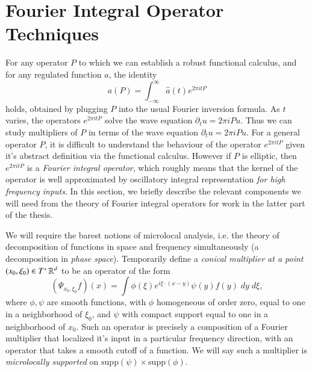 \section{Fourier Integral Operator Techniques} \label{sec:FourierIntegral}

For any operator $P$ to which we can establish a robust functional calculus, and for any regulated function $a$, the identity
%
\begin{equation}
  a(P) = \int_{-\infty}^\infty \widehat{a}(t) e^{2 \pi itP}
\end{equation}
%
holds, obtained by plugging $P$ into the usual Fourier inversion formula. As $t$ varies, the operators $e^{2 \pi itP}$ solve the wave equation $\partial_t u = 2 \pi i P u$. Thus we can study multipliers of $P$ in terms of the wave equation $\partial_t u = 2 \pi i P u$. For a general operator $P$, it is difficult to understand the behaviour of the operator $e^{2 \pi i t P}$ given it's abstract definition via the functional calculus. However if $P$ is elliptic, then $e^{2 \pi i t P}$ is a \emph{Fourier integral operator}, which roughly means that the kernel of the operator is well approximated by oscillatory integral representation \emph{for high frequency inputs}. In this section, we briefly describe the relevant components we will need from the theory of Fourier integral operators for work in the latter part of the thesis.

We will require the barest notions of microlocal analysis, i.e. the theory of decomposition of functions in space and frequency simultaneously (a decomposition in \emph{phase space}). Temporarily define a \emph{conical multiplier at a point $(x_0,\xi_0) \in T^* \operatorname{\mathbb{R}}^d$} to be an operator of the form
%
\begin{equation}
  (\Psi_{x_0,\xi_0} f)(x) = \int \phi( \xi ) e^{i \xi \cdot (x - y)} \psi(y) f(y)\; dy\; d\xi,
\end{equation}
%
where $\phi,\psi$ are smooth functions, with $\phi$ homogeneous of order zero, equal to one in a neighborhood of $\xi_0$, and $\psi$ with compact support equal to one in a neighborhood of $x_0$. Such an operator is precisely a composition of a Fourier multiplier that localized it's input in a particular frequency direction, with an operator that takes a smooth cutoff of a function. We will say such a multiplier is \emph{microlocally supported} on $\text{supp}(\psi) \times \text{supp}(\phi)$.

